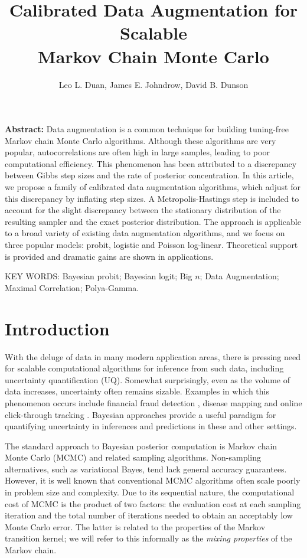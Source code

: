 \documentclass[10pt]{article}
\title
{{Calibrated Data Augmentation for Scalable \\ Markov Chain Monte Carlo}}
\author{
     Leo L. Duan,
     James E. Johndrow,
     David B. Dunson
}
\begin{document}
    
\maketitle

{\bf Abstract:} Data augmentation is a common technique for building tuning-free Markov chain Monte Carlo algorithms. Although these algorithms are very popular, 
autocorrelations are often high in large samples, leading to poor computational efficiency.  This phenomenon has been attributed to a discrepancy between Gibbs step sizes and the rate of posterior concentration.  In this article, we propose a family of calibrated data augmentation algorithms, which adjust for this discrepancy by inflating step sizes.  A Metropolis-Hastings step is included to account for the slight discrepancy between the stationary distribution of the resulting sampler and the exact posterior distribution.  The approach is applicable to a broad variety of existing data augmentation algorithms, and we focus on three popular models: probit, logistic and Poisson log-linear.  Theoretical support is provided and dramatic gains are shown in applications.
\vskip 12pt

{\noindent  KEY WORDS:  Bayesian probit; Bayesian logit; Big $n$; Data Augmentation; Maximal Correlation; Polya-Gamma.}
{}

\section{Introduction}

With the deluge of data in many modern application areas, there is pressing need for scalable computational algorithms for inference from such data, including uncertainty quantification (UQ).  Somewhat surprisingly, even as the volume of data increases, uncertainty often remains sizable.  Examples in which this phenomenon occurs include financial fraud detection \citep{ngai2011application}, disease mapping \citep{wakefield2007disease} and online click-through tracking \citep{wang2010click}.  Bayesian approaches provide a useful paradigm for quantifying uncertainty in inferences and predictions in these and other settings.

The standard approach to Bayesian posterior computation is Markov chain Monte Carlo (MCMC) and related sampling algorithms. Non-sampling alternatives, such as variational Bayes, tend lack general accuracy guarantees. However, it is well known that conventional MCMC algorithms often scale poorly in problem size and complexity. Due to its sequential nature, the computational cost of MCMC is the product of two factors: the evaluation cost at each sampling iteration and the total number of iterations needed to obtain an acceptably low Monte Carlo error. The latter is related to the properties of the Markov transition kernel; we will refer to this informally as the \emph{mixing properties} of the Markov chain. 
\end{document}
